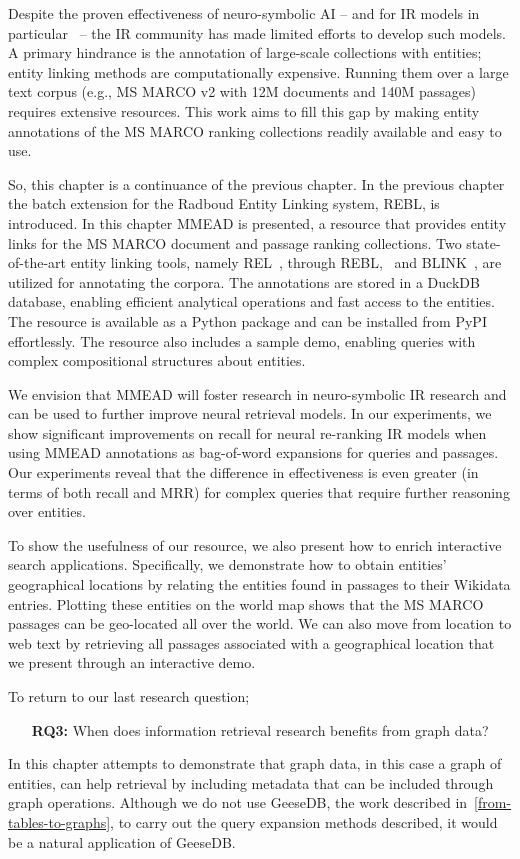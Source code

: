 Despite the proven effectiveness of neuro-symbolic AI -- and for IR models in particular~\citep{Tran:2022:DRE, Gerritse:2022:EMBERT, chatterjee2022bert} -- the IR community has made limited efforts to develop such models. A primary hindrance is the annotation of large-scale collections with entities; entity linking methods are computationally expensive. Running them over a large text corpus (e.g., MS MARCO v2 with 12M documents and 140M passages) requires extensive resources. This work aims to fill this gap by making entity annotations of the MS MARCO ranking collections readily available and easy to use.

So, this chapter is a continuance of the previous chapter. In the previous chapter the batch extension for the Radboud Entity Linking system, REBL, is introduced. In this chapter MMEAD is presented, a resource that provides entity links for the MS MARCO document and passage ranking collections. Two state-of-the-art entity linking tools, namely REL~\citep{rel}, through REBL,~\citep{rebl} and BLINK~\citep{blink}, are utilized for annotating the corpora. The annotations are stored in a DuckDB database, enabling efficient analytical operations and fast access to the entities. The resource is available as a Python package and can be installed from PyPI effortlessly. The resource also includes a sample demo, enabling queries with complex compositional structures about entities. 

We envision that MMEAD will foster research in neuro-symbolic IR research and can be used to further improve neural retrieval models. In our experiments, we show significant improvements on recall for neural re-ranking IR models when using MMEAD annotations as bag-of-word expansions for queries and passages. Our experiments reveal that the difference in effectiveness is even greater (in terms of both recall and MRR) for complex queries that require further reasoning over entities.

To show the usefulness of our resource, we also present how to enrich interactive search applications. Specifically, we demonstrate how to obtain entities' geographical locations by relating the entities found in passages to their Wikidata entries. Plotting these entities on the world map shows that the MS MARCO passages can be geo-located all over the world.
We can also move from location to web text by retrieving all passages associated with a geographical location that we present through an interactive demo. 

To return to our last research question; 
\begin{itemize}
	\item[\textbf{RQ3:}] When does information retrieval research benefits from graph data?
\end{itemize}   
In this chapter attempts to demonstrate that graph data, in this case a graph of entities, can help retrieval by including metadata that can be included through graph operations. Although we do not use GeeseDB, the work described in~\cref{from-tables-to-graphs}, to carry out the query expansion methods described, it would be a natural application of GeeseDB. 

